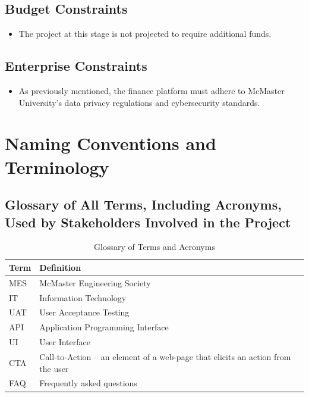 \documentclass[12pt]{article}
\begin{document}
\subsection{Budget Constraints}
\begin{itemize}
    \item The project at this stage is not projected to require additional funds.
\end{itemize}

\subsection{Enterprise Constraints}
\begin{itemize}
    \item As previously mentioned, the finance platform must adhere to McMaster University’s data privacy regulations and cybersecurity standards.
\end{itemize}

\section{Naming Conventions and Terminology}
\subsection{Glossary of All Terms, Including Acronyms, Used by Stakeholders Involved in the Project}
\begin{table}[h]
    \centering
    \begin{tabular}{|>{\raggedright}p{3cm}|>{\raggedright\arraybackslash}p{10cm}|}
        \hline
        \textbf{Term} & \textbf{Definition} \\
        \hline
        MES & McMaster Engineering Society \\
        \hline
        IT & Information Technology \\
        \hline
        UAT & User Acceptance Testing \\
        \hline
        API & Application Programming Interface \\
        \hline
        UI & User Interface \\
        \hline
        CTA & Call-to-Action – an element of a web-page that elicits an action from the user \\
        \hline
        FAQ & Frequently asked questions \\
        \hline
    \end{tabular}
    \caption{Glossary of Terms and Acronyms}
    \label{tab:glossary}
\end{table}
\end{document}

